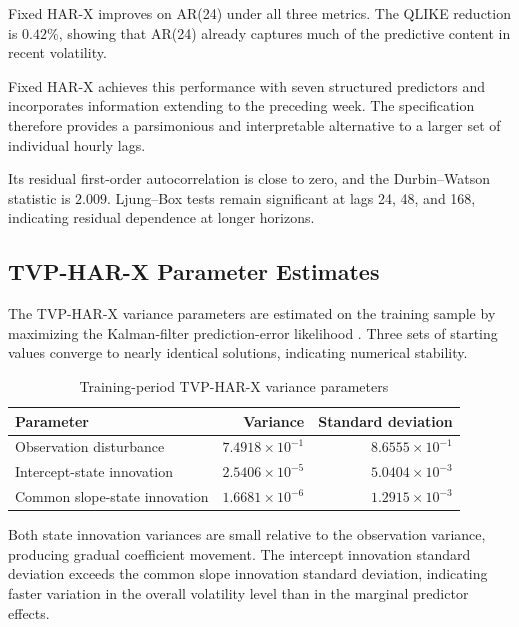 Fixed HAR-X improves on AR(24) under all three metrics. The
QLIKE reduction is \(0.42\%\), showing that AR(24) already
captures much of the predictive content in recent volatility.

Fixed HAR-X achieves this performance with seven structured
predictors and incorporates information extending to the
preceding week. The specification therefore provides a
parsimonious and interpretable alternative to a larger set of
individual hourly lags.

Its residual first-order autocorrelation is close to zero, and
the Durbin--Watson statistic is \(2.009\). Ljung--Box tests
remain significant at lags 24, 48, and 168, indicating
residual dependence at longer horizons.

\subsection{TVP-HAR-X Parameter Estimates}

The TVP-HAR-X variance parameters are estimated on the
training sample by maximizing the Kalman-filter
prediction-error likelihood \citep{durbin2012}. Three sets of
starting values converge to nearly identical solutions,
indicating numerical stability.

\begin{table}[H]
\centering
\caption{Training-period TVP-HAR-X variance parameters}
\label{tab:tvp-variance-parameters}
\begin{tabular}{lrr}
\toprule
Parameter
& Variance
& Standard deviation \\
\midrule
Observation disturbance
& \(7.4918\times10^{-1}\)
& \(8.6555\times10^{-1}\) \\

Intercept-state innovation
& \(2.5406\times10^{-5}\)
& \(5.0404\times10^{-3}\) \\

Common slope-state innovation
& \(1.6681\times10^{-6}\)
& \(1.2915\times10^{-3}\) \\
\bottomrule
\end{tabular}
\end{table}

Both state innovation variances are small relative to the
observation variance, producing gradual coefficient movement.
The intercept innovation standard deviation exceeds the common
slope innovation standard deviation, indicating faster
variation in the overall volatility level than in the marginal
predictor effects.

